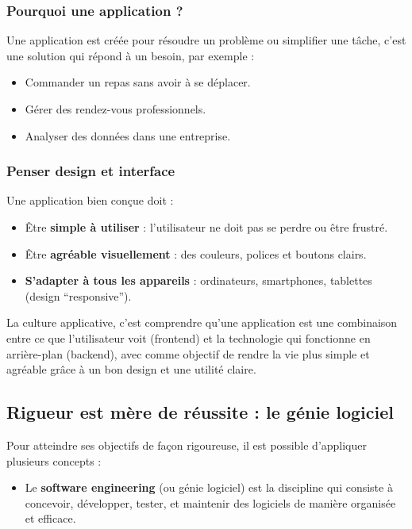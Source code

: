 \documentclass[
  letterpaper,
  DIV=11,
  numbers=noendperiod]{scrartcl}
\providecommand{\tightlist}{%
  \setlength{\itemsep}{0pt}\setlength{\parskip}{0pt}}\usepackage{longtable,booktabs,array}
\begin{document}
\subsubsection{Pourquoi une application
?}\label{pourquoi-une-application}

Une application est créée pour résoudre un problème ou simplifier une
tâche, c'est une solution qui répond à un besoin, par exemple :

\begin{itemize}
\item
  Commander un repas sans avoir à se déplacer.
\item
  Gérer des rendez-vous professionnels.
\item
  Analyser des données dans une entreprise.
\end{itemize}

\subsubsection{Penser design et
interface}\label{penser-design-et-interface}

Une application bien conçue doit :

\begin{itemize}
\item
  Être \textbf{simple à utiliser} : l'utilisateur ne doit pas se perdre
  ou être frustré.
\item
  Être \textbf{agréable visuellement} : des couleurs, polices et boutons
  clairs.
\item
  \textbf{S'adapter à tous les appareils} : ordinateurs, smartphones,
  tablettes (design ``responsive'').
\end{itemize}

La culture applicative, c'est comprendre qu'une application est une
combinaison entre ce que l'utilisateur voit (frontend) et la technologie
qui fonctionne en arrière-plan (backend), avec comme objectif de rendre
la vie plus simple et agréable grâce à un bon design et une utilité
claire.

\subsection{Rigueur est mère de réussite : le génie
logiciel}\label{rigueur-est-muxe8re-de-ruxe9ussite-le-guxe9nie-logiciel}

Pour atteindre ses objectifs de façon rigoureuse, il est possible
d'appliquer plusieurs concepts :

\begin{itemize}
\tightlist
\item
  Le \textbf{software engineering} (ou génie logiciel) est la discipline
  qui consiste à concevoir, développer, tester, et maintenir des
  logiciels de manière organisée et efficace.
\end{itemize}
\end{document}
